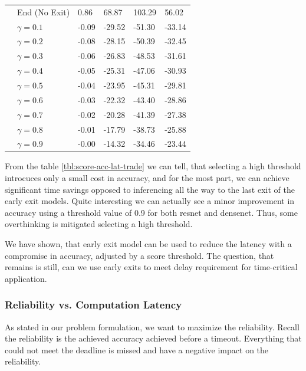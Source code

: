 \begin{minipage}[t]{\linewidth}
\begin{small}
\begin{longtabu}{>{\bfseries}X|X|X[r]|X[r]|X[r]|X[r]}
		\hline
		 & End (No Exit) & 0.86 & 68.87 & 103.29 & 56.02 \tabularnewline {}
		&$ \gamma = 0.1 $ 	& -0.09 & -29.52 & -51.30 & -33.14 \tabularnewline
		&$ \gamma = 0.2 $ 	& -0.08 & -28.15 & -50.39 & -32.45 \tabularnewline 
		&$ \gamma = 0.3 $ 	& -0.06 & -26.83 & -48.53 & -31.61 \tabularnewline
		&$ \gamma = 0.4 $ 	& -0.05 & -25.31 & -47.06 & -30.93 \tabularnewline 
		&$ \gamma = 0.5 $ 	& -0.04 & -23.95 & -45.31 & -29.81 \tabularnewline
		&$ \gamma = 0.6 $ 	& -0.03 & -22.32 & -43.40 & -28.86 \tabularnewline 
		&$ \gamma = 0.7 $ 	& -0.02 & -20.28 & -41.39 & -27.38 \tabularnewline 
		&$ \gamma = 0.8 $ 	& -0.01 & -17.79 & -38.73 & -25.88 \tabularnewline 
		&$ \gamma = 0.9 $ 	& -0.00 & -14.32 & -34.46 & -23.44 \tabularnewline 
		\bottomrule
	\end{longtabu}
\end{small}
\end{minipage}

From the table \ref{tbl:score-acc-lat-trade} we can tell, that selecting a high threshold introcuces only a small cost in accuracy, and for the most part, we can achieve significant time savings opposed to inferencing all the way to the last exit of the early exit models. Quite interesting we can actually see a minor improvement in accuracy using a threshold value of 0.9 for both \gls{resnet} and \gls{densenet}. Thus, some overthinking is mitigated selecting a high threshold.


We have shown, that early exit model can be used to reduce the latency with a compromise in accuracy, adjusted by a score threshold. The question, that remains is still, can we use early exits to meet delay requirement for time-critical application. 

\newpage\subsubsection{Reliability vs. Computation Latency}

As stated in our problem formulation, we want to maximize the reliability. Recall the reliability is the achieved accuracy achieved before a timeout. Everything that could not meet the deadline is missed and have a negative impact on the reliability.

